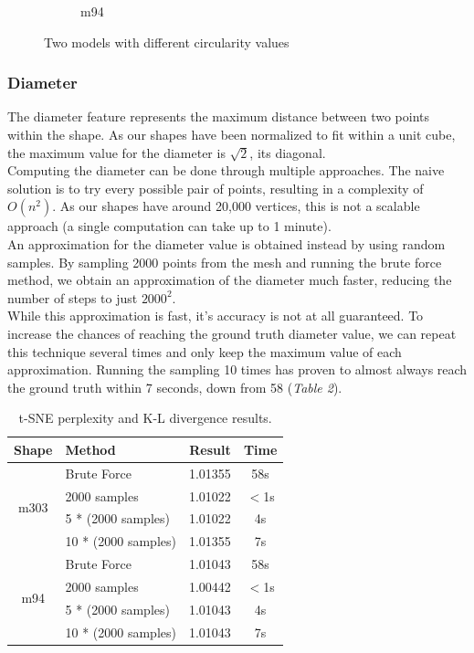 \documentclass{bigdata}
\begin{document}
\begin{figure}[h!]
\begin{subfigure}[b]{0.4\linewidth}
		\caption{m94}
	\end{subfigure}
	\caption{Two models with different circularity values}
	\label{fig:circularity}
\end{figure}

\subsubsection{Diameter}
The diameter feature represents the maximum distance between two points within the shape. As our shapes have been normalized to fit within a unit cube, the maximum value for the diameter is $\sqrt{2}$, its diagonal. \\
Computing the diameter can be done through multiple approaches. The naive solution is to try every possible pair of points, resulting in a complexity of $O(n^2)$. As our shapes have around 20,000 vertices, this is not a scalable approach (a single computation can take up to 1 minute). \\
An approximation for the diameter value is obtained instead by using random samples. By sampling 2000 points from the mesh and running the brute force method, we obtain an approximation of the diameter much faster, reducing the number of steps to just $2000^2$. \\
While this approximation is fast, it's accuracy is not at all guaranteed. To increase the chances of reaching the ground truth diameter value, we can repeat this technique several times and only keep the maximum value of each approximation. Running the sampling 10 times has proven to almost always reach the ground truth within 7 seconds, down from 58 (\textit{Table 2}).

\begin{table}[h!]
	\begin{center}
		\begin{tabular}{c|l|c|c} %
			\textbf{Shape} & \textbf{Method} & \textbf{Result} & \textbf{Time} \\
			\hline
\multirow{4}{3em}{m303}& Brute Force & 1.01355 & 58s\\
				  & 2000 samples & 1.01022 & $<$1s\\
				  & 5 * (2000 samples) & 1.01022 & 4s\\
				  & 10 * (2000 samples) & 1.01355 & 7s\\
			\hline
\multirow{4}{3em}{m94}& Brute Force & 1.01043 & 58s\\
				  & 2000 samples & 1.00442 & $<$1s\\
				  & 5 * (2000 samples) & 1.01043 & 4s\\
				  & 10 * (2000 samples) & 1.01043 & 7s
		\end{tabular}
	\end{center}
	\caption{t-SNE perplexity and K-L divergence results.}
	\label{Table 3,}
\end{table}
\end{document}
